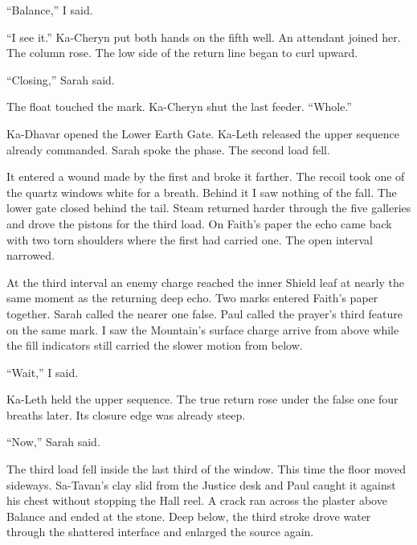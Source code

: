 ``Balance,'' I said.\par

``I see it.'' Ka-Cheryn put both hands on the fifth well. An attendant joined her. The column rose. The low side of the return line began to curl upward.\par

``Closing,'' Sarah said.\par

The float touched the mark. Ka-Cheryn shut the last feeder. ``Whole.''\par

Ka-Dhavar opened the Lower Earth Gate. Ka-Leth released the upper sequence already commanded. Sarah spoke the phase. The second load fell.\par

It entered a wound made by the first and broke it farther. The recoil took one of the quartz windows white for a breath. Behind it I saw nothing of the fall. The lower gate closed behind the tail. Steam returned harder through the five galleries and drove the pistons for the third load. On Faith's paper the echo came back with two torn shoulders where the first had carried one. The open interval narrowed.\par

At the third interval an enemy charge reached the inner Shield leaf at nearly the same moment as the returning deep echo. Two marks entered Faith's paper together. Sarah called the nearer one false. Paul called the prayer's third feature on the same mark. I saw the Mountain's surface charge arrive from above while the fill indicators still carried the slower motion from below.\par

``Wait,'' I said.\par

Ka-Leth held the upper sequence. The true return rose under the false one four breaths later. Its closure edge was already steep.\par

``Now,'' Sarah said.\par

The third load fell inside the last third of the window. This time the floor moved sideways. Sa-Tavan's clay slid from the Justice desk and Paul caught it against his chest without stopping the Hall reel. A crack ran across the plaster above Balance and ended at the stone. Deep below, the third stroke drove water through the shattered interface and enlarged the source again.\par

